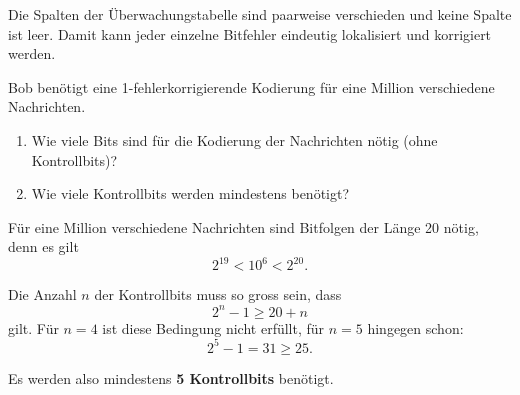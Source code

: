 \begin{myexercise}
\begin{myanswer}
\begin{center}
        \end{center}

        Die Spalten der Überwachungstabelle sind paarweise verschieden
        und keine Spalte ist leer. Damit kann jeder einzelne Bitfehler
        eindeutig lokalisiert und korrigiert werden.

    \end{myanswer}
\end{myexercise}


\begin{myexercise}
    Bob benötigt eine 1-fehlerkorrigierende Kodierung
    für eine Million verschiedene Nachrichten.

    \begin{enumerate}
        \item Wie viele Bits sind für die Kodierung der
              Nachrichten nötig (ohne Kontrollbits)?

        \item Wie viele Kontrollbits werden mindestens benötigt?
    \end{enumerate}
    \begin{myanswer}
        Für eine Million verschiedene Nachrichten sind Bitfolgen der
        Länge 20 nötig, denn es gilt
        \[
            2^{19} < 10^6 < 2^{20}.
        \]

        Die Anzahl \(n\) der Kontrollbits muss so gross sein, dass
        \[
            2^n-1 \geq 20+n
        \]
        gilt. Für \(n=4\) ist diese Bedingung nicht erfüllt, für
        \(n=5\) hingegen schon:
        \[
            2^5-1=31\geq 25.
        \]

        Es werden also mindestens \textbf{5 Kontrollbits} benötigt.
    \end{myanswer}
\end{myexercise}


